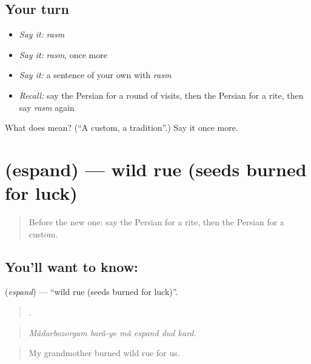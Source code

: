 \subsection*{Your turn}
\begin{itemize}
\raggedright
  \item \emph{Say it:} \emph{rasm}
  \item \emph{Say it:} \emph{rasm}, once more
  \item \emph{Say it:} a sentence of your own with \emph{rasm}
  \item \emph{Recall:} say the Persian for a round of visits, then the Persian for a rite, then say \emph{rasm} again
\end{itemize}

\begin{tcolorbox}[breakable,colback=teal!4,colframe=teal!35!black,title={Before you move on}]
What does  mean? (\textquotedblleft{}A custom, a tradition\textquotedblright{}.) Say it once more.
\end{tcolorbox}
\section[\texorpdfstring{\fa{اسپند} (espand)}{اسپند (espand)}]{ (espand) — wild rue (seeds burned for luck)}

\label{lesson:FA-C340-espand}



\begin{quote}
Before the new one: say the Persian for a rite, then the Persian for a custom.
\end{quote}

\subsection*{You'll want to know: }
\textbf{} (\emph{espand}) — \textquotedblleft{}wild rue (seeds burned for luck)\textquotedblright{}.

\begin{quote}
     .
\end{quote}

\begin{quote}
\emph{Mâdarbozorgam barâ-ye mâ espand dud kard.}
\end{quote}

\begin{quote}
My grandmother burned wild rue for us.
\end{quote}

